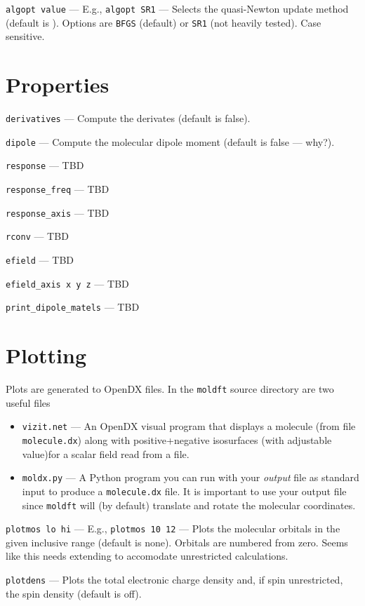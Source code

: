 \documentclass[letterpaper]{book}
\begin{document}
{{\tt algopt value} --- E.g., {\tt algopt SR1} --- Selects the quasi-Newton update method (default is ).  Options are {\tt BFGS} (default) or {\tt SR1} (not heavily tested).  Case sensitive.

\section{Properties}

{\tt derivatives} --- Compute the derivates (default is false).

{\tt dipole} --- Compute the molecular dipole moment (default is false --- why?).

{\tt response} --- TBD

{\tt response\_freq} ---  TBD

{\tt response\_axis} --- TBD

{\tt rconv} --- TBD

{\tt efield} --- TBD

{\tt efield\_axis x y z} --- TBD

{\tt print\_dipole\_matels} --- TBD

\section{Plotting}

Plots are generated to OpenDX files.  In the {\tt moldft} source directory are two useful files

\begin{itemize}
\item {\tt vizit.net} --- An OpenDX visual program that displays a
  molecule (from file {\tt molecule.dx}) along with positive+negative
  isosurfaces (with adjustable value)for a scalar field read from a
  file.

\item {\tt moldx.py} --- A Python program you can run with your {\em
  output} file as standard input to produce a {\tt molecule.dx} file.
  It is important to use your output file since {\tt moldft} will (by
  default) translate and rotate the molecular coordinates.
  
\end{itemize}

{\tt plotmos lo hi} --- E.g., {\tt plotmos 10 12} --- Plots the molecular orbitals in the given inclusive range (default is none).  Orbitals are numbered from zero.  Seems like this needs extending to accomodate unrestricted calculations.

{\tt plotdens} --- Plots the total electronic charge density and, if spin unrestricted, the spin density (default is off).

}
\end{document}
